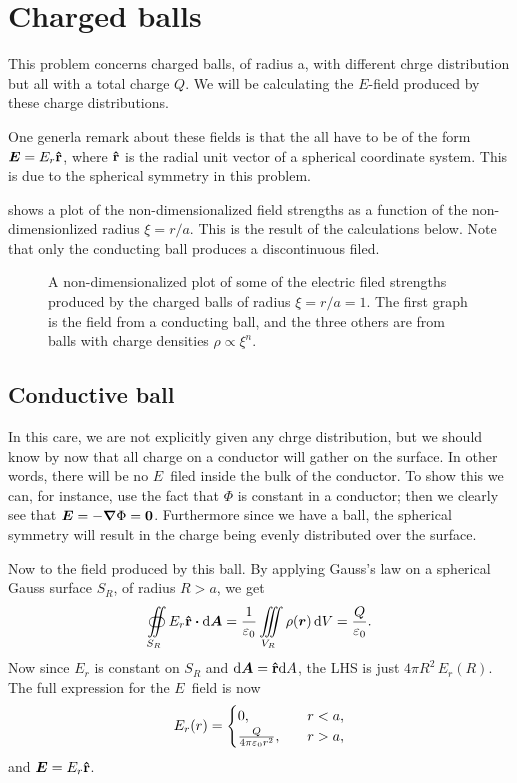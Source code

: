 \documentclass[11pt,letter, swedish, english
]{article}
\newcommand{\enaught}{\ensuremath\varepsilon_0}
\renewcommand{\thesubsection}{\arabic{section} (\alph{subsection})}
\begin{document}
\section{Charged balls}
\renewcommand{\thesubsection}{\arabic{section} (\roman{subsection})}
This problem concerns charged balls, of radius a, with different chrge
distribution but all with a total charge $Q$. We will be calculating
the $E$-field produced by these charge distributions. 

One generla remark about these fields is that the all have to be of
the form $\vb*E=E_r\vu{r}$, where $\vu{r}$ is the radial unit vector
of a spherical coordinate system. This is due to the spherical
symmetry in this problem. 


 shows a plot of the non-dimensionalized field
strengths as a function of the non-dimensionlized radius
$\xi=r/a$. This is the result of the calculations below. Note that
only the conducting ball produces a discontinuous filed.

\begin{figure}\centering

\caption{A non-dimensionalized plot of some of the electric filed
  strengths produced by the charged balls of radius $\xi=r/a=1$. The first
  graph is the field from a conducting ball, and the three others are
  from balls with charge densities $\rho\propto\xi^n$.}
\label{fig:2_e-field}
\end{figure}

\subsection{Conductive ball}
In this care, we are not explicitly given any chrge distribution, but
we should know by now that all charge on a conductor will gather on
the surface. In other words, there will be no $E$~filed inside the
bulk of the conductor. To show this we can, for instance, use the fact
that $\Phi$ is constant in a conductor; then we 
clearly see that $\vb*E=-\grad\Phi=\vb0$. Furthermore since we have a
ball, the spherical symmetry will result in the charge being evenly
distributed over the surface. 

Now to the field produced by this ball. By applying Gauss's law on
a spherical Gauss surface $S_R$, of radius $R>a$, we get
\begin{equation}
\oiint\limits_{S_R}E_r\vu{r}\vdot\rd\vb*{A}
=\frac{1}{\enaught}\iiint\limits_{V_R} \rho(\vb*r)\id{V}
=\frac{Q}{\enaught}.
\end{equation}
Now since $E_r$ is constant on $S_R$ and $\mathrm{d}\vb*A=\vu{r}\mathrm{d}{A}$, the
LHS is just $4\pi R^2\, E_r\!(R)$. The full expression for the $E$~field is
now
\begin{equation}
E_r(r)=
\begin{cases}
0, &r<a,\\
\frac{Q}{4\pi\enaught r^2}\qcomma &r>a,
\end{cases}
\end{equation}
and $\vb*E=E_r\vu{r}$.
\end{document}
